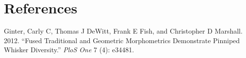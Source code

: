 \documentclass[
]{article}
\newlength{\cslhangindent}
\newenvironment{CSLReferences}[2] %
 {\begin{list}{}{%
  \setlength{\itemindent}{0pt}
  \setlength{\leftmargin}{0pt}
  \setlength{\parsep}{0pt}
  \ifodd #1
   \setlength{\leftmargin}{\cslhangindent}
   \setlength{\itemindent}{-1\cslhangindent}
  \fi
  \setlength{\itemsep}{#2\baselineskip}}}
 {\end{list}}
\begin{document}
\newpage
\section{References}

\label{refs}
\begin{CSLReferences}{1}{0}
Ginter, Carly C, Thomas J DeWitt, Frank E Fish, and Christopher D
Marshall. 2012. {``Fused Traditional and Geometric Morphometrics
Demonstrate Pinniped Whisker Diversity.''} \emph{PloS One} 7 (4):
e34481.

\end{CSLReferences}
\end{document}
